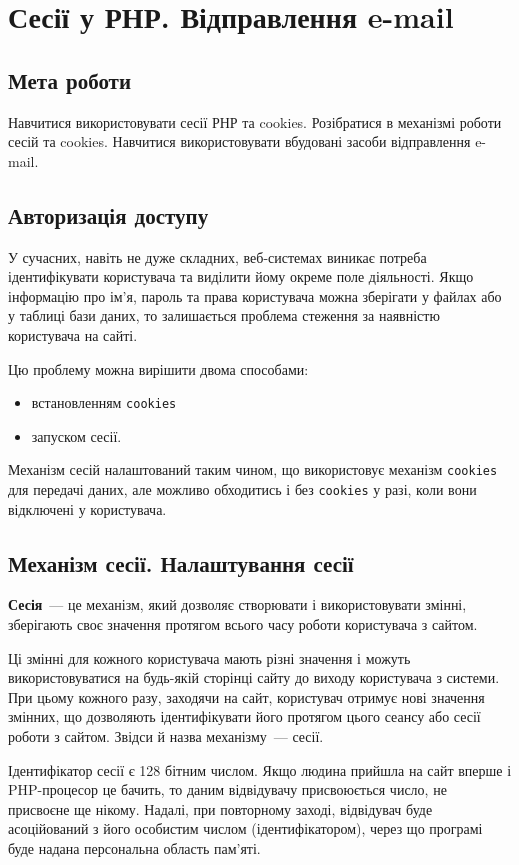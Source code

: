 \chapter{Сесії у РНР. Відправлення e-mail}
\section*{Мета роботи}
Навчитися використовувати сесії РНР та cookies. Розібратися в механізмі роботи сесій та cookies. Навчитися використовувати вбудовані засоби відправлення e-mail.
\section{Авторизація доступу}
У сучасних, навіть не дуже складних, веб-системах виникає потреба ідентифікувати користувача та виділити йому окреме поле діяльності. Якщо інформацію про ім'я, пароль та права користувача можна зберігати у файлах або у таблиці бази даних, то залишається проблема стеження за наявністю користувача на сайті.

Цю проблему можна вирішити двома способами:
\begin{itemize}
\item встановленням \verb'cookies'
\item запуском сесії.
\end{itemize}

Механізм сесій налаштований таким чином, що використовує механізм \verb'cookies' для передачі даних, але можливо обходитись і без \verb'cookies' у разі, коли вони відключені у користувача.
\section{Механізм сесії. Налаштування сесії}
\textbf{Сесія}~--- це механізм, який дозволяє створювати і використовувати змінні, зберігають своє значення протягом всього часу роботи користувача з сайтом.

Ці змінні для кожного користувача мають різні значення і можуть використовуватися на будь-якій сторінці сайту до виходу користувача з системи. При цьому кожного разу, заходячи на сайт, користувач отримує нові значення змінних, що дозволяють ідентифікувати його протягом цього сеансу або сесії роботи з сайтом. Звідси й назва механізму~--- сесії. 

Ідентифікатор сесії є 128 бітним числом. Якщо людина прийшла на сайт вперше і PHP-процесор це бачить, то даним відвідувачу присвоюється число, не присвоєне ще нікому. Надалі, при повторному заході, відвідувач буде асоційований з його особистим числом (ідентифікатором), через що програмі буде надана персональна область пам'яті.

